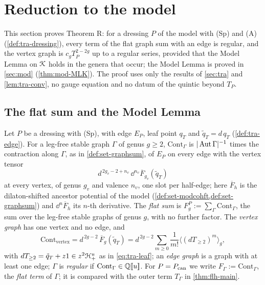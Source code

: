 
\section{Reduction to the model}
\label{sec:red}

This section proves Theorem R: for a dressing $P$ of the model with (Sp) and (A) (\cref{def:tra-dressing}), every term of the flat graph sum with an edge is regular, and the vertex graph is $c_gT_P^{2-2g}$ up to a regular series, provided that the Model Lemma on $\mathcal{K}$ holds in the genera that occur; the Model Lemma is proved in \cref{sec:mod} (\cref{thm:mod-MLK}). The proof uses only the results of \cref{sec:tra} and \cref{lem:tra-conv}, no gauge equation and no datum of the quintic beyond $T_P$.

\subsection{The flat sum and the Model Lemma}
\label{sec:red-sum}

\begin{defn}
\label{def:red-flatsum}
Let $P$ be a dressing with (Sp), with edge $E_P$, leaf point $q_T$ and $\tilde q_T = d\,q_T$ (\cref{def:tra-edge}). For a leg-free stable graph $\Gamma$ of genus $g\geq 2$, $\mathrm{Cont}_\Gamma$ is $|\operatorname{Aut}\Gamma|^{-1}$ times the contraction along $\Gamma$, as in \cref{def:set-graphsum}, of $E_P$ on every edge with the vertex tensor
\[
d^{\,2g_v-2+n_v}\,\dd^{n_v}\overline F_{g_v}(\tilde q_T)
\]
at every vertex, of genus $g_v$ and valence $n_v$, one slot per half-edge; here $\overline F_h$ is the dilaton-shifted ancestor potential of the model (\cref{def:set-modcohft,def:set-graphsum}) and $\dd^n\overline F_h$ its $n$-th derivative. The \emph{flat sum} is $F^P_g := \sum_\Gamma\mathrm{Cont}_\Gamma$, the sum over the leg-free stable graphs of genus $g$, with no further factor. The \emph{vertex graph} has one vertex and no edge, and
\begin{equation}
\label{eq:red-vertex}
\mathrm{Cont}_{\mathrm{vertex}} = d^{\,2g-2}\,\overline F_g(\tilde q_T) = d^{\,2g-2}\sum_{m\geq 0}\frac1{m!}\langle(dT_{\geq 2})^m\rangle_g ,
\end{equation}
with $dT_{\geq 2} = \tilde q_T+z1\in z^2\mathcal{H}^u_+$ as in \eqref{eq:tra-leaf};
an \emph{edge graph} is a graph with at least one edge; $\Gamma$ is \emph{regular} if $\mathrm{Cont}_\Gamma\in\mathbb{Q}[\![ u ]\!]$. For $P = P_{\mathrm{can}}$ we write $F_\Gamma := \mathrm{Cont}_\Gamma$, the \emph{flat term} of $\Gamma$; it is compared with the outer term $T_\Gamma$ in \cref{thm:flh-main}.
\end{defn}

